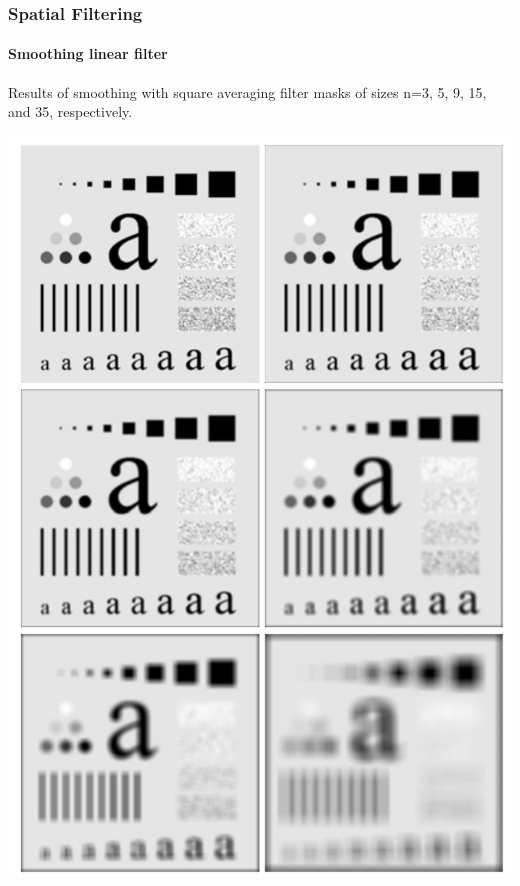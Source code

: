 \documentclass{beamer}
\begin{document}
\begin{frame}
\frametitle{Spatial Filtering}
\framesubtitle{Smoothing linear filter}
Results of smoothing with square averaging filter masks of sizes n=3, 5, 9, 15, and 35, respectively. 
\begin{center}\includegraphics[scale=0.19]{images/Spatial4-averagefilter.png}\end{center}
\end{frame}
\end{document}
